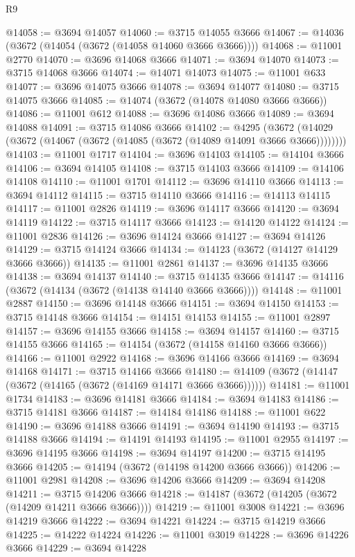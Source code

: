 \begin{lexlean}{R9}
\begin{coremodule}
@14058 := @3694 @14057
@14060 := @3715 @14055 @3666
@14067 := @14036 (@3672 (@14054 (@3672 (@14058 @14060 @3666 @3666))))
@14068 := @11001 @2770
@14070 := @3696 @14068 @3666
@14071 := @3694 @14070
@14073 := @3715 @14068 @3666
@14074 := @14071 @14073
@14075 := @11001 @633
@14077 := @3696 @14075 @3666
@14078 := @3694 @14077
@14080 := @3715 @14075 @3666
@14085 := @14074 (@3672 (@14078 @14080 @3666 @3666))
@14086 := @11001 @612
@14088 := @3696 @14086 @3666
@14089 := @3694 @14088
@14091 := @3715 @14086 @3666
@14102 := @4295
    (@3672 (@14029 (@3672 (@14067 (@3672 (@14085 (@3672 (@14089 @14091 @3666 @3666))))))))
@14103 := @11001 @1717
@14104 := @3696 @14103
@14105 := @14104 @3666
@14106 := @3694 @14105
@14108 := @3715 @14103 @3666
@14109 := @14106 @14108
@14110 := @11001 @1701
@14112 := @3696 @14110 @3666
@14113 := @3694 @14112
@14115 := @3715 @14110 @3666
@14116 := @14113 @14115
@14117 := @11001 @2826
@14119 := @3696 @14117 @3666
@14120 := @3694 @14119
@14122 := @3715 @14117 @3666
@14123 := @14120 @14122
@14124 := @11001 @2836
@14126 := @3696 @14124 @3666
@14127 := @3694 @14126
@14129 := @3715 @14124 @3666
@14134 := @14123 (@3672 (@14127 @14129 @3666 @3666))
@14135 := @11001 @2861
@14137 := @3696 @14135 @3666
@14138 := @3694 @14137
@14140 := @3715 @14135 @3666
@14147 := @14116 (@3672 (@14134 (@3672 (@14138 @14140 @3666 @3666))))
@14148 := @11001 @2887
@14150 := @3696 @14148 @3666
@14151 := @3694 @14150
@14153 := @3715 @14148 @3666
@14154 := @14151 @14153
@14155 := @11001 @2897
@14157 := @3696 @14155 @3666
@14158 := @3694 @14157
@14160 := @3715 @14155 @3666
@14165 := @14154 (@3672 (@14158 @14160 @3666 @3666))
@14166 := @11001 @2922
@14168 := @3696 @14166 @3666
@14169 := @3694 @14168
@14171 := @3715 @14166 @3666
@14180 := @14109 (@3672 (@14147 (@3672 (@14165 (@3672 (@14169 @14171 @3666 @3666))))))
@14181 := @11001 @1734
@14183 := @3696 @14181 @3666
@14184 := @3694 @14183
@14186 := @3715 @14181 @3666
@14187 := @14184 @14186
@14188 := @11001 @622
@14190 := @3696 @14188 @3666
@14191 := @3694 @14190
@14193 := @3715 @14188 @3666
@14194 := @14191 @14193
@14195 := @11001 @2955
@14197 := @3696 @14195 @3666
@14198 := @3694 @14197
@14200 := @3715 @14195 @3666
@14205 := @14194 (@3672 (@14198 @14200 @3666 @3666))
@14206 := @11001 @2981
@14208 := @3696 @14206 @3666
@14209 := @3694 @14208
@14211 := @3715 @14206 @3666
@14218 := @14187 (@3672 (@14205 (@3672 (@14209 @14211 @3666 @3666))))
@14219 := @11001 @3008
@14221 := @3696 @14219 @3666
@14222 := @3694 @14221
@14224 := @3715 @14219 @3666
@14225 := @14222 @14224
@14226 := @11001 @3019
@14228 := @3696 @14226 @3666
@14229 := @3694 @14228

\end{coremodule}
\end{lexlean}
